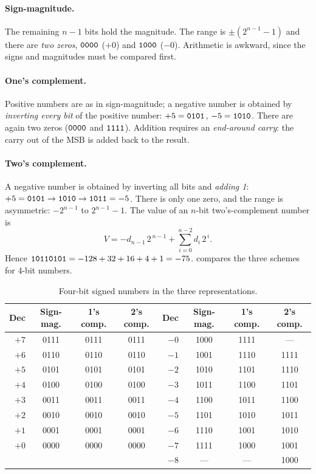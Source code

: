 
\paragraph{Sign-magnitude.} The remaining $n-1$ bits hold the magnitude. The range is $\pm(2^{n-1}-1)$ and there are \emph{two zeros}, $\mathtt{0000}$ ($+0$) and $\mathtt{1000}$ ($-0$). Arithmetic is awkward, since the signs and magnitudes must be compared first.

\paragraph{One's complement.} Positive numbers are as in sign-magnitude; a negative number is obtained by \emph{inverting every bit} of the positive number: $+5=\mathtt{0101}$, $-5=\mathtt{1010}$. There are again two zeros ($\mathtt{0000}$ and $\mathtt{1111}$). Addition requires an \emph{end-around carry}: the carry out of the MSB is added back to the result.

\paragraph{Two's complement.} A negative number is obtained by inverting all bits and \emph{adding 1}: $+5=\mathtt{0101}\to\mathtt{1010}\to\mathtt{1011}=-5$. There is only one zero, and the range is asymmetric: $-2^{n-1}$ to $2^{n-1}-1$. The value of an $n$-bit two's-complement number is
\begin{equation}
  V = -d_{n-1}\,2^{\,n-1} + \sum_{i=0}^{n-2} d_i\,2^{\,i}.
  \label{eq:twos}
\end{equation}
Hence $\mathtt{10110101} = -128+32+16+4+1=-75$.  compares the three schemes for 4-bit numbers.

\begin{table}[htbp]
\centering
\small
\caption{Four-bit signed numbers in the three representations.}
\label{tab:signed}
\begin{tabular}{@{}rccc@{\hspace{3em}}rccc@{}}
\toprule
Dec & Sign-mag. & 1's comp. & 2's comp. & Dec & Sign-mag. & 1's comp. & 2's comp.\\
\midrule
$+7$&0111&0111&0111 & $-0$&1000&1111&---\\
$+6$&0110&0110&0110 & $-1$&1001&1110&1111\\
$+5$&0101&0101&0101 & $-2$&1010&1101&1110\\
$+4$&0100&0100&0100 & $-3$&1011&1100&1101\\
$+3$&0011&0011&0011 & $-4$&1100&1011&1100\\
$+2$&0010&0010&0010 & $-5$&1101&1010&1011\\
$+1$&0001&0001&0001 & $-6$&1110&1001&1010\\
$+0$&0000&0000&0000 & $-7$&1111&1000&1001\\
    &&&              & $-8$&---&---&1000\\
\bottomrule
\end{tabular}
\end{table}

